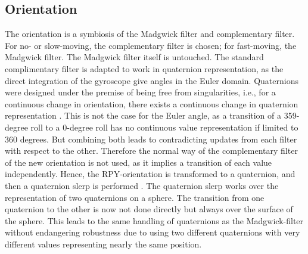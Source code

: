 \documentclass[letterpaper, 10 pt, conference]{ieeeconf}  %
\begin{document}
\subsection{Orientation}
The orientation is a symbiosis of the Madgwick filter and complementary filter. For no- or slow-moving, the complementary filter is chosen; for fast-moving, the Madgwick filter. The Madgwick filter itself is untouched.
The standard complimentary filter is adapted to work in quaternion representation,
 as the direct integration of the gyroscope give angles in the Euler domain.
Quaternions were designed under the premise of being free from singularities, i.e., for a continuous change in orientation, there exists a continuous change in quaternion representation \cite{becker2017dealing}. 
This is not the case for the Euler angle, as a transition of a 359-degree roll to a 0-degree roll has no continuous value representation if limited to 360 degrees.
 But combining both leads to contradicting updates from each filter with respect to the other.
 Therefore the normal way of the complementary filter of the new orientation is 
not used, as it implies a transition of each value independently.
Hence, the RPY-orientation is transformed to a quaternion, and then a quaternion slerp is performed \cite{dam1998quaternions}.
 The quaternion slerp works over the representation of two quaternions on a sphere. The transition from one quaternion to the other is now not done directly but always over the surface of the sphere.
 This leads to the same handling of quaternions as the Madgwick-filter without endangering robustness due to using two different quaternions with very different values representing nearly the same position.
 
\end{document}
